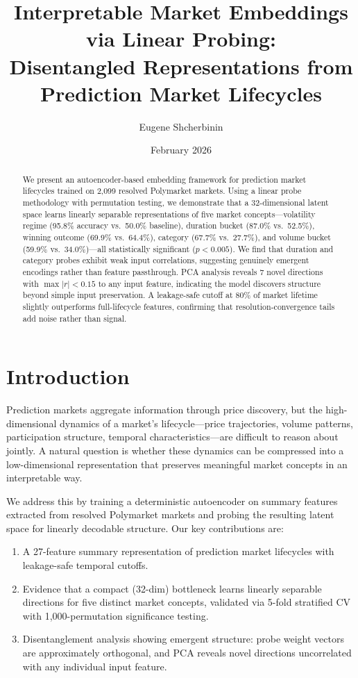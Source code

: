 \documentclass[11pt,a4paper]{article}
\title{\textbf{Interpretable Market Embeddings via Linear Probing:\\Disentangled Representations from Prediction Market Lifecycles}}
\author{Eugene Shcherbinin}
\affil{Bloomsbury Tech}
\date{February 2026}
\begin{document}
\maketitle

\begin{abstract}
We present an autoencoder-based embedding framework for prediction market lifecycles trained on 2,099 resolved Polymarket markets. Using a linear probe methodology with permutation testing, we demonstrate that a 32-dimensional latent space learns linearly separable representations of five market concepts---volatility regime (95.8\% accuracy vs.\ 50.0\% baseline), duration bucket (87.0\% vs.\ 52.5\%), winning outcome (69.9\% vs.\ 64.4\%), category (67.7\% vs.\ 27.7\%), and volume bucket (59.9\% vs.\ 34.0\%)---all statistically significant ($p < 0.005$). We find that duration and category probes exhibit weak input correlations, suggesting genuinely emergent encodings rather than feature passthrough. PCA analysis reveals 7 novel directions with $\max|r| < 0.15$ to any input feature, indicating the model discovers structure beyond simple input preservation. A leakage-safe cutoff at 80\% of market lifetime slightly outperforms full-lifecycle features, confirming that resolution-convergence tails add noise rather than signal.
\end{abstract}

\section{Introduction}

Prediction markets aggregate information through price discovery, but the high-dimensional dynamics of a market's lifecycle---price trajectories, volume patterns, participation structure, temporal characteristics---are difficult to reason about jointly. A natural question is whether these dynamics can be compressed into a low-dimensional representation that preserves meaningful market concepts in an interpretable way.

We address this by training a deterministic autoencoder on summary features extracted from resolved Polymarket markets and probing the resulting latent space for linearly decodable structure. Our key contributions are:

\begin{enumerate}[nosep]
    \item A 27-feature summary representation of prediction market lifecycles with leakage-safe temporal cutoffs.
    \item Evidence that a compact (32-dim) bottleneck learns linearly separable directions for five distinct market concepts, validated via 5-fold stratified CV with 1,000-permutation significance testing.
    \item Disentanglement analysis showing emergent structure: probe weight vectors are approximately orthogonal, and PCA reveals novel directions uncorrelated with any individual input feature.
\end{enumerate}
\end{document}
